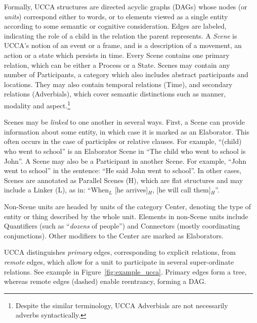 \documentclass[11pt,a4paper,table]{article}
\begin{document}
  Formally, UCCA structures are directed acyclic graphs (DAGs) whose nodes (or {\it units}) correspond either to words,
  or to elements viewed as a single entity according to some semantic or cognitive consideration.
  Edges are labeled, indicating the role of a child in the relation the parent represents.
  A {\it Scene} is UCCA's notion of an event or a frame, and is a description of a movement, an action or a state which persists in time. 
  Every Scene contains one primary relation, which can be either a Process or a State. 
  Scenes may contain any number of Participants, a category which also includes abstract participants and locations.
  They may also contain temporal relations (Time), and secondary relations (Adverbials), 
  which cover semantic distinctions such as manner, modality and aspect.\footnote{Despite the
  similar terminology, UCCA Adverbials are not necessarily adverbs syntactically.}

  Scenes may be \textit{linked} to one another in several ways.
  First, a Scene can provide information about some entity,
  in which case it is marked as an Elaborator.
  This often occurs in the case of participles or relative clauses.
  For example, ``(child) who went to school'' is an Elaborator Scene
  in ``The child who went to school is John''.
  A Scene may also be a Participant in another Scene. For example, ``John went to school'' in the sentence: ``He said John went to school''. 
  In other cases, Scenes are annotated as Parallel Scenes (H), which are flat structures and may include a Linker (L), 
  as in: ``When$_L$ [he arrives]$_H$, [he will call them]$_H$''.

  Non-Scene units are headed by units of the category Center,
  denoting the type of entity or thing described by the whole unit.
  Elements in non-Scene units include Quantifiers (such as ``{\it dozens} of people'') and
  Connectors (mostly coordinating conjunctions).
  Other modifiers to the Center are marked as Elaborators.
  
  
  UCCA distinguishes \textit{primary} edges, corresponding 
  to explicit relations, from \textit{remote} edges,
  which allow for a unit to participate
  in several super-ordinate relations.
  See example in Figure~\ref{fig:example_ucca}.
  Primary edges form a tree, whereas remote edges (dashed) enable reentrancy, forming a DAG.
\end{document}
